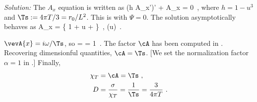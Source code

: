 {\color{blue} 
\textit{Solution:} 
The $A_x$ equation is written as
\be
%
(h A_x')' +  A_x = 0~,
%
\ee
where $h=1-u^3$ and $\Ts:=4\pi T/3=r_0/L^2$. This is  with $\Psi=0$. The solution asymptotically behaves as 
\be
%
A_x =  \left\{ 1 +  u + \cdots \right\}~, 
\qquad (u)~.
%
\ee

$\vevA{x} = i \omega/\Ts$, so 
\be
%
\sigma = \frac{\cA}{\Ts} = 1~.
\label{eq:cond_ads4} 
%
\ee
The factor $\cA$ has been computed in . Recovering dimensionful quantities, $\cA=\Ts$. [We set the normalization factor $\alpha=1$ in .] Finally,
\begin{align}
%
\chi_T &= \cA = \Ts~, \\
D &= \frac{\sigma}{\chi_T} = \frac{1}{\Ts} = \frac{3}{4\pi T}~.
%
\end{align}
}


